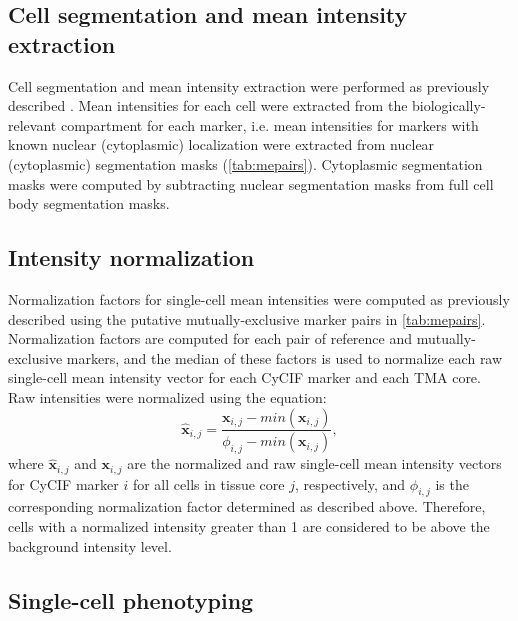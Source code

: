 \documentclass[preprint,review,3p,12pt]{elsarticle}
\begin{document}
\subsection{Cell segmentation and mean intensity extraction}
Cell segmentation and mean intensity extraction were performed as previously described \cite{cmif2020}. Mean intensities for each cell were extracted from the biologically-relevant compartment for each marker, i.e. mean intensities for markers with known nuclear (cytoplasmic) localization were extracted from nuclear (cytoplasmic) segmentation masks (\autoref{tab:mepairs}). Cytoplasmic segmentation masks were computed by subtracting nuclear segmentation masks from full cell body segmentation masks.

\subsection{Intensity normalization}
Normalization factors for single-cell mean intensities were computed as previously described \cite{Chang2020} using the putative mutually-exclusive marker pairs in \autoref{tab:mepairs}. Normalization factors are computed for each pair of reference and mutually-exclusive markers, and the median of these factors is used to normalize each raw single-cell mean intensity vector for each CyCIF marker and each TMA core. Raw intensities were normalized using the equation:
\begin{equation}
\label{eq:norm}
\hat{\mathbf{x}}_{i,j} = \frac{\mathbf{x}_{i,j}-min(\mathbf{x}_{i,j})}{\phi_{i,j}-min(\mathbf{x}_{i,j})},
\end{equation}
where $\hat{\mathbf{x}}_{i,j}$ and $\mathbf{x}_{i,j}$ are the normalized and raw single-cell mean intensity vectors for CyCIF marker $i$ for all cells in tissue core $j$, respectively, and $\phi_{i,j}$ is the corresponding normalization factor determined as described above. Therefore, cells with a normalized intensity greater than 1 are considered to be above the background intensity level.

\subsection{Single-cell phenotyping}
\end{document}
